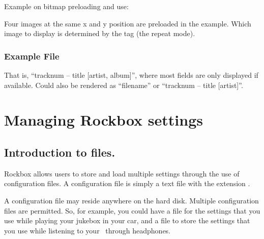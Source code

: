 Example on bitmap preloading and use:
\begin{example}
\end{example}
Four images at the same x and y position are preloaded in the example. Which 
image to display is determined by the  tag (the repeat mode).

\subsubsection{Example File}
\begin{example}
\end{example}
That is, ``tracknum -- title [artist, album]'', where most fields are only
displayed if available. Could also be rendered as ``filename'' or ``tracknum --
title [artist]''.

%  

\section{\label{ref:manage_settings}Managing Rockbox settings}

	\subsection{Introduction to  files.}
	Rockbox allows users to store and load multiple settings through the use of 
	configuration files.  A configuration file is simply a text file with the 
	extension .  

	A configuration file may reside anywhere on the hard disk. Multiple
  configuration files are permitted. So, for example, you could have
  a  file for the settings that you use while playing your
  jukebox in your car, and a  file to store the
  settings that you use while listening to your \dap\ through headphones.

